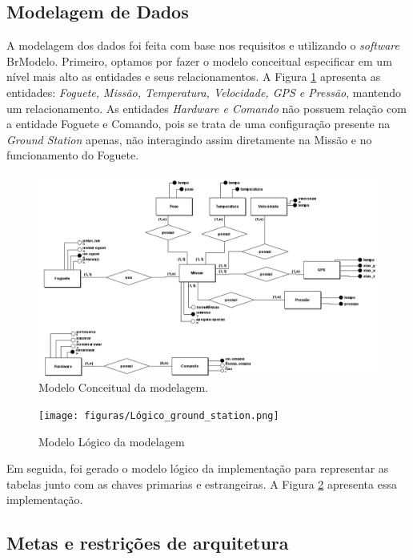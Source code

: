 \subsection{Modelagem de Dados}

A modelagem dos dados foi feita com base nos requisitos e utilizando o \textit{software} BrModelo. Primeiro, optamos por fazer o modelo conceitual especificar em um nível mais alto as entidades e seus relacionamentos. A Figura \ref{fig:conceitual} apresenta as entidades: \textit{Foguete, Missão, Temperatura, Velocidade, GPS e Pressão}, mantendo um relacionamento. As entidades \textit{Hardware e Comando} não possuem relação com a entidade Foguete e Comando, pois se trata de uma configuração presente na \textit{Ground Station} apenas, não interagindo assim diretamente na Missão e no funcionamento do Foguete.

\begin{figure}[h!]
	\centering
	\label{server-side}
		\includegraphics[keepaspectratio=true,scale=0.4]{figuras/conceitual_ground_station.png}
	\caption{Modelo Conceitual da modelagem.}
	\label{fig:conceitual}
\end{figure}


\begin{figure}[h!]
	\centering
	\label{server-side}
		\texttt{[image: figuras/Lógico\_ground\_station.png]}
	\caption{Modelo Lógico da modelagem}
	\label{fig:logico}
\end{figure}

Em seguida, foi gerado o modelo lógico da implementação para representar as tabelas junto com as chaves primarias e estrangeiras. A Figura \ref{fig:logico} apresenta essa implementação.

\subsection{Metas e restrições de arquitetura}
\label{metas_restricoes}

